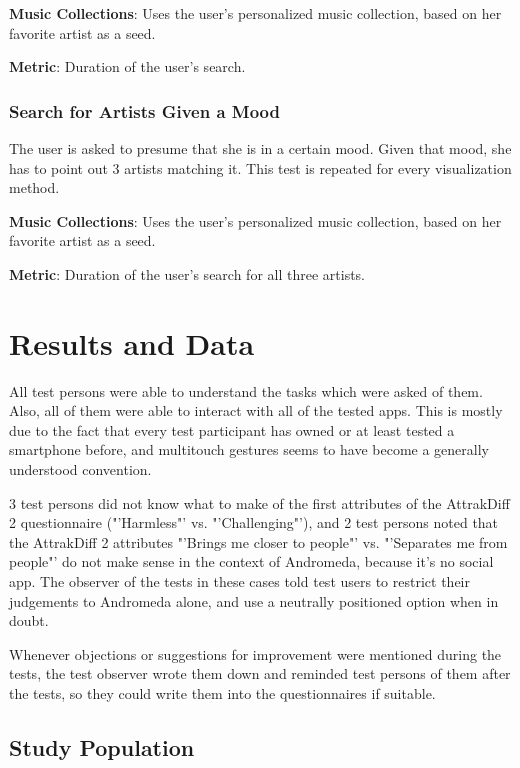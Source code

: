 \textbf{Music Collections}: Uses the user's personalized music collection, based on her favorite artist as a seed.

\textbf{Metric}: Duration of the user's search.

	
\subsubsection{Search for Artists Given a Mood}
	
The user is asked to presume that she is in a certain mood. Given that mood, she has to point out 3 artists matching it. This test is repeated for every visualization method.
	
\textbf{Music Collections}: Uses the user's personalized music collection, based on her favorite artist as a seed.
	
\textbf{Metric}: Duration of the user's search for all three artists.


\section{Results and Data}

All test persons were able to understand the tasks which were asked of them. Also, all of them were able to interact with all of the tested apps. This is mostly due to the fact that every test participant has owned or at least tested a smartphone before, and multitouch gestures seems to have become a generally understood convention.

3 test persons did not know what to make of the first attributes of the AttrakDiff 2 questionnaire ("'Harmless"' vs. "'Challenging"'), and 2 test persons noted that the AttrakDiff 2 attributes "'Brings me closer to people"' vs. "'Separates me from people"' do not make sense in the context of Andromeda, because it's no social app. The observer of the tests in these cases told test users to restrict their judgements to Andromeda alone, and use a neutrally positioned option when in doubt.

Whenever objections or suggestions for improvement were mentioned during the tests, the test observer wrote them down and reminded test persons of them after the tests, so they could write them into the questionnaires if suitable.

\subsection{Study Population}

